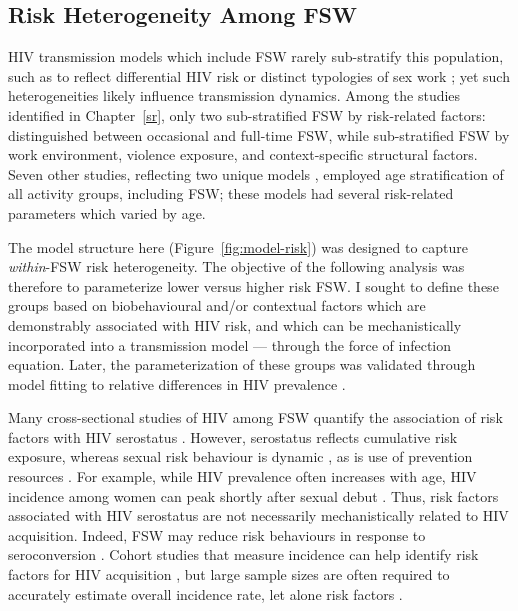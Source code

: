 \subsection{Risk Heterogeneity Among FSW}\label{model.par.fsw}
HIV transmission models which include FSW rarely sub-stratify this population, such as to reflect
differential HIV risk or distinct typologies of sex work \cite{Blanchard2008,Scorgie2012};
yet such heterogeneities likely influence transmission dynamics.
Among the studies identified in Chapter~\ref{sr},
only two sub-stratified FSW by risk-related factors:
\citet{Low2015} distinguished between occasional and full-time FSW, while
\citet{Shannon2015} sub-stratified FSW by
work environment, violence exposure, and context-specific structural factors.
Seven other studies, reflecting two unique models \cite{Johnson2012,Maheu-Giroux2017},
employed age stratification of all activity groups, including FSW;
these models had several risk-related parameters which varied by age.
\par
The model structure here (Figure~\ref{fig:model-risk})
was designed to capture \emph{within}-FSW risk heterogeneity.
The objective of the following analysis was therefore to parameterize
lower versus higher risk FSW.
I sought to define these groups based on biobehavioural and/or contextual factors
which are demonstrably associated with HIV risk,
and which can be mechanistically incorporated into a transmission model ---
\ie through the force of infection equation.
Later, the parameterization of these groups was validated through model fitting
to relative differences in HIV prevalence .
\par
Many cross-sectional studies of HIV among FSW quantify
the association of risk factors with HIV serostatus
\cite{Aklilu2001,Dunkle2005,Scorgie2012,Jonas2020}.
However, serostatus reflects cumulative risk exposure,
whereas sexual risk behaviour is dynamic \cite{Watts2010,vanWees2020},
as is use of prevention resources \cite{Roberts2020}.
For example, while HIV prevalence often increases with age,
HIV incidence among women can peak shortly after sexual debut \cite{Dellar2015}.
Thus, risk factors associated with HIV serostatus are not necessarily
mechanistically related to HIV acquisition.
Indeed, FSW may reduce risk behaviours in response to seroconversion \cite{McClelland2006}.
Cohort studies that measure incidence
can help identify risk factors for HIV acquisition \cite{McKinnon2015,Nouaman2022},
but large sample sizes are often required to accurately estimate overall incidence rate,
let alone risk factors \cite{Priddy2011}.
